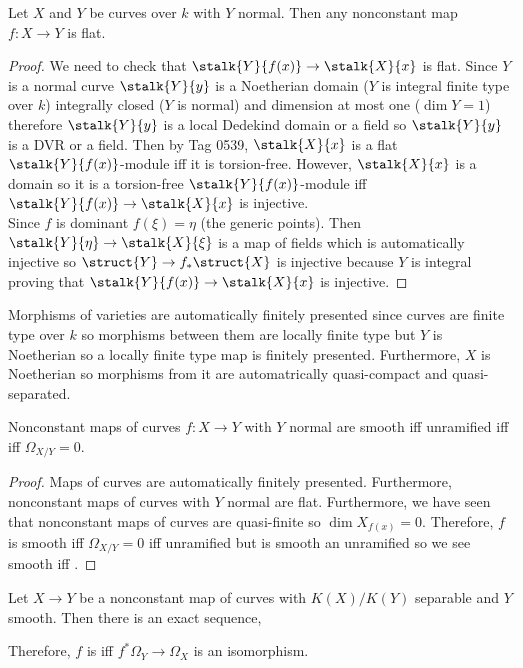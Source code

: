 \documentclass[12pt]{article}
\begin{document}
\begin{prop}
Let $X$ and $Y$ be curves over $k$ with $Y$ normal. Then any nonconstant map $f : X \to Y$ is flat.
\end{prop}

\begin{proof}
We need to check that $\stalk{Y}{f(x)} \to \stalk{X}{x}$ is flat. Since $Y$ is a normal curve $\stalk{Y}{y}$ is a Noetherian domain ($Y$ is integral finite type over $k$) integrally closed ($Y$ is normal) and dimension at most one ($\dim{Y} = 1$) therefore $\stalk{Y}{y}$ is a local Dedekind domain or a field so $\stalk{Y}{y}$ is a DVR or a field. Then by Tag 0539, $\stalk{X}{x}$ is a flat $\stalk{Y}{f(x)}$-module iff it is torsion-free. However, $\stalk{X}{x}$ is a domain so it is a torsion-free $\stalk{Y}{f(x)}$-module iff $\stalk{Y}{f(x)} \to \stalk{X}{x}$ is injective.
\bigskip\\
Since $f$ is dominant $f(\xi) = \eta$ (the generic points). Then $\stalk{Y}{\eta} \to \stalk{X}{\xi}$ is a map of fields which is automatically injective so $\struct{Y} \to f_* \struct{X}$ is injective because $Y$ is integral proving that $\stalk{Y}{f(x)} \to \stalk{X}{x}$ is injective. 
\end{proof}

\begin{rmk}
Morphisms of varieties are automatically finitely presented since curves are finite type over $k$ so morphisms between them are locally finite type but $Y$ is Noetherian so a locally finite type map is finitely presented. Furthermore, $X$ is Noetherian so morphisms from it are automatrically quasi-compact and quasi-separated.
\end{rmk}

\begin{prop}
Nonconstant maps of curves $f : X \to Y$ with $Y$ normal are smooth iff unramified iff \etale iff $\Omega_{X/Y} = 0$.
\end{prop}

\begin{proof}
Maps of curves are automatically finitely presented. Furthermore, nonconstant maps of curves with $Y$ normal are flat. Furthermore, we have seen that nonconstant maps of curves are quasi-finite so $\dim{X_{f(x)}} = 0$. Therefore, $f$ is smooth iff $\Omega_{X/Y} = 0$ iff unramified but \etale is smooth an unramified so we see smooth iff \etale. 
\end{proof}

\begin{lemma}
Let $X \to Y$ be a nonconstant map of curves with $K(X) / K(Y)$ separable and $Y$ smooth. Then there is an exact sequence,
\begin{center}
\end{center}
Therefore, $f$ is \etale iff $f^* \Omega_Y \to \Omega_X$ is an isomorphism.
\end{lemma}
\end{document}
